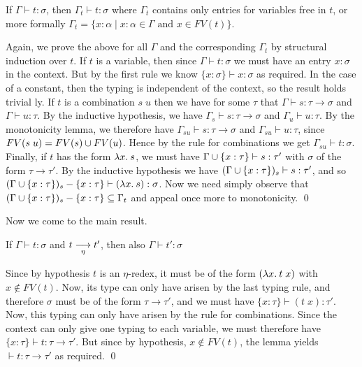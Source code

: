\begin{lemma}

If $\Gamma \vdash t : \sigma$, then $\Gamma_t \vdash t : \sigma$ where
$\Gamma_t$ contains only entries for variables free in $t$, or more formally
$\Gamma_t = \{x:\alpha \mid x:\alpha \in \Gamma \mbox{ and } x \in FV(t)\}$.

\proof Again, we prove the above for all $\Gamma$ and the corresponding
$\Gamma_t$ by structural induction over $t$. If $t$ is a variable, then since
$\Gamma \vdash t : \sigma$ we must have an entry $x : \sigma$ in the context.
But by the first rule we know $\{x : \sigma\} \vdash x : \sigma$ as required.
In the case of a constant, then the typing is independent of the context, so
the result holds trivial ly. If $t$ is a combination $s\; u$ then we have for
some $\tau$ that $\Gamma \vdash s : \tau \to \sigma$ and $\Gamma \vdash u :
\tau$. By the inductive hypothesis, we have $\Gamma_s \vdash s : \tau \to
\sigma$ and $\Gamma_u \vdash u : \tau$. By the monotonicity lemma, we therefore
have $\Gamma_{su} \vdash s : \tau \to \sigma$ and $\Gamma_{su} \vdash u :
\tau$, since $FV(s\; u) = FV(s) \cup FV(u)$. Hence by the rule for
combinations we get $\Gamma_{su} \vdash  t : \sigma$. Finally, if $t$ has the
form $\lambda x.\: s$, we must have $\Gamma \cup \{x:\tau\} \vdash s:\tau'$ with
$\sigma$ of the form $\tau \to \tau'$. By the inductive hypothesis we have
$(\Gamma \cup \{x:\tau\})_s \vdash s:\tau'$, and so $(\Gamma \cup
\{x:\tau\})_s - \{x:\tau\} \vdash (\lambda x.\: s) : \sigma$. Now we need simply
observe that $(\Gamma \cup \{x:\tau\})_s - \{x:\tau\} \subseteq \Gamma_t$ and
appeal once more to monotonicity. \qed

\end{lemma}

\noindent Now we come to the main result.

\begin{theorem}

If $\Gamma \vdash t : \sigma$ and $t \mathrel{\mathop{\longrightarrow}\limits_{\eta}} t'$, then also $\Gamma \vdash t' :
\sigma$

\proof Since by hypothesis $t$ is an $\eta$-redex, it must be of the form
$(\lambda x.\: t\; x)$ with $x \not\in FV(t)$. Now, its type can only have arisen
by the last typing rule, and therefore $\sigma$ must be of the form $\tau \to
\tau'$, and we must have $\{x:\tau\} \vdash (t\; x) : \tau'$. Now, this typing
can only have arisen by the rule for combinations. Since the context can only
give one typing to each variable, we must therefore have $\{x:\tau\} \vdash t :
\tau \to \tau'$. But since by hypothesis, $x \not\in FV(t)$, the lemma yields
$\vdash t : \tau \to \tau'$ as required. \qed

\end{theorem}

